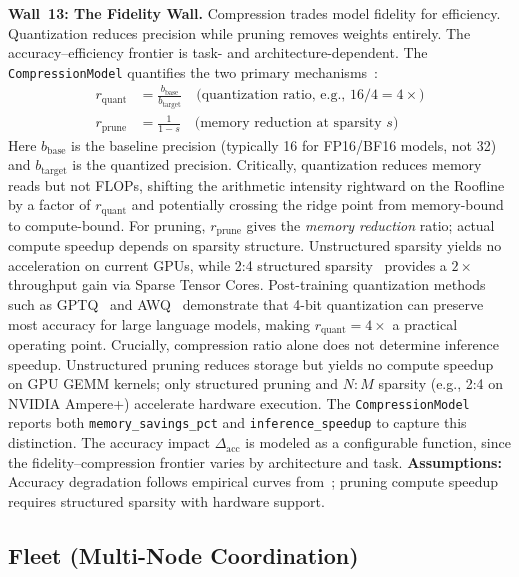 \documentclass[10pt,twocolumn]{article}
\begin{document}
\textbf{Wall~13: The Fidelity Wall.} Compression trades model fidelity for efficiency. Quantization reduces precision while pruning removes weights entirely. The accuracy--efficiency frontier is task- and architecture-dependent. The \texttt{CompressionModel} quantifies the two primary mechanisms~\citep{han2016deep, gholami2022}:
\begin{align}
\label{eq:compression}
r_{\text{quant}} &= \frac{b_{\text{base}}}{b_{\text{target}}} \quad \text{(quantization ratio, e.g., } 16/4 = 4{\times}\text{)} \\
r_{\text{prune}} &= \frac{1}{1 - s} \quad \text{(memory reduction at sparsity } s\text{)}
\end{align}
Here $b_{\text{base}}$ is the baseline precision (typically 16 for FP16/BF16 models, not 32) and $b_{\text{target}}$ is the quantized precision. Critically, quantization reduces memory reads but not FLOPs, shifting the arithmetic intensity rightward on the Roofline by a factor of $r_{\text{quant}}$ and potentially crossing the ridge point from memory-bound to compute-bound. For pruning, $r_{\text{prune}}$ gives the \emph{memory reduction} ratio; actual compute speedup depends on sparsity structure. Unstructured sparsity yields no acceleration on current GPUs, while 2:4 structured sparsity~\citep{nvidia2023h100} provides a $2{\times}$ throughput gain via Sparse Tensor Cores. Post-training quantization methods such as GPTQ~\citep{frantar2023gptq} and AWQ~\citep{lin2025} demonstrate that 4-bit quantization can preserve most accuracy for large language models, making $r_{\text{quant}} = 4{\times}$ a practical operating point. Crucially, compression ratio alone does not determine inference speedup. Unstructured pruning reduces storage but yields no compute speedup on GPU GEMM kernels; only structured pruning and $N{:}M$ sparsity (e.g., 2:4 on NVIDIA Ampere+) accelerate hardware execution. The \texttt{CompressionModel} reports both \texttt{memory\_savings\_pct} and \texttt{inference\_speedup} to capture this distinction. The accuracy impact $\Delta_{\text{acc}}$ is modeled as a configurable function, since the fidelity--compression frontier varies by architecture and task. \textbf{Assumptions:} Accuracy degradation follows empirical curves from~\citet{gholami2022}; pruning compute speedup requires structured sparsity with hardware support.

\subsection{Fleet (Multi-Node Coordination)}
\label{sec:walls-fleet}
\end{document}
